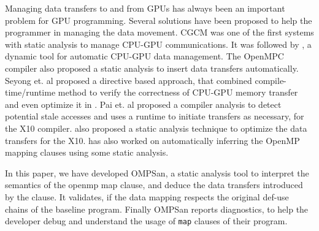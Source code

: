 Managing data transfers to and from GPUs has always been 
an important problem for GPU programming. 
Several solutions have been proposed to help 
the programmer in managing the data movement.
CGCM \cite{Jablin:2011:ACC:1993316.1993516} was one of the first
systems with static analysis to manage CPU-GPU communications. 
It was followed by \cite{Jablin:2012:DMD:2259016.2259038}, a 
dynamic tool for automatic   
CPU-GPU data management. 
The OpenMPC compiler \cite{Lee:2010:OEO:1884643.1884674} also 
proposed a static analysis to insert data transfers automatically.
Seyong et. al proposed a directive based approach, that 
combined compile-time/runtime 
method to verify the correctness of CPU-GPU memory transfer
and even optimize it in \cite{6877281}.
Pai et. al \cite{Pai:2012:FEA:2370816.2370824} proposed a compiler analysis to 
detect potential stale accesses and uses a runtime to initiate transfers as necessary, for the X10 compiler. \cite{Thangamani:2018:ORD:3243176.3243209} 
also proposed a static analysis technique to optimize 
the data transfers for the X10.
\cite{Mendonca:2017:DAA:3086564.3084540} has also worked on automatically 
inferring the OpenMP mapping clauses using some static analysis. 


In this paper, we have developed OMPSan, a static analysis 
tool to interpret the semantics of the openmp map clause, 
and deduce the data transfers introduced by the clause.
It validates, if the data mapping respects the 
original def-use chains of the baseline program. 
Finally OMPSan reports diagnostics, to help 
the developer debug and understand the usage of \texttt{map}
clauses of their program. 

